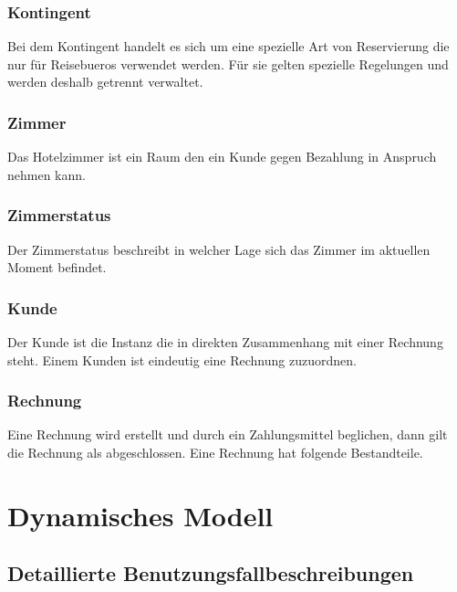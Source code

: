 \documentclass[10pt,a4paper,titlepage]{article}
\begin{document}
\subsubsection{Kontingent}
Bei dem Kontingent handelt es sich um eine spezielle Art von Reservierung die nur für \Glspl{Reisebuero} verwendet werden. Für sie gelten spezielle Regelungen und werden deshalb getrennt verwaltet.
\subsubsection{Zimmer}
Das Hotelzimmer ist ein Raum den ein Kunde gegen Bezahlung in Anspruch nehmen kann.
\subsubsection{Zimmerstatus}
Der Zimmerstatus beschreibt in welcher Lage sich das Zimmer im aktuellen Moment befindet.
\subsubsection{Kunde}
Der Kunde ist die Instanz die in direkten Zusammenhang mit einer Rechnung steht.
Einem Kunden ist eindeutig eine Rechnung zuzuordnen.
\subsubsection{Rechnung}
Eine Rechnung wird erstellt und durch ein Zahlungsmittel beglichen, dann gilt die Rechnung als abgeschlossen. Eine Rechnung hat folgende Bestandteile.

\newpage

\section{Dynamisches Modell}
\subsection{Detaillierte Benutzungsfallbeschreibungen}













\newpage
\end{document}
